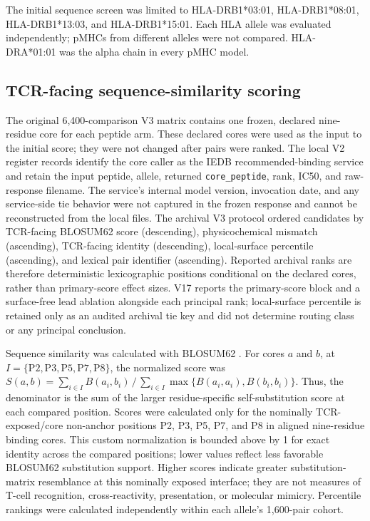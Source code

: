 \documentclass[11pt]{article}
\begin{document}
The initial sequence screen was limited to HLA-DRB1*03:01, HLA-DRB1*08:01, HLA-DRB1*13:03, and HLA-DRB1*15:01. Each HLA allele was evaluated independently; pMHCs from different alleles were not compared. HLA-DRA*01:01 was the alpha chain in every pMHC model.

\subsection{TCR-facing sequence-similarity scoring}
The original 6,400-comparison V3 matrix contains one frozen, declared nine-residue core for each peptide arm. These declared cores were used as the input to the initial score; they were not changed after pairs were ranked. The local V2 register records identify the core caller as the IEDB recommended-binding service and retain the input peptide, allele, returned \texttt{core\_peptide}, rank, IC50, and raw-response filename. The service's internal model version, invocation date, and any service-side tie behavior were not captured in the frozen response and cannot be reconstructed from the local files. The archival V3 protocol ordered candidates by TCR-facing BLOSUM62 score (descending), physicochemical mismatch (ascending), TCR-facing identity (descending), local-surface percentile (ascending), and lexical pair identifier (ascending). Reported archival ranks are therefore deterministic lexicographic positions conditional on the declared cores, rather than primary-score effect sizes. V17 reports the primary-score block and a surface-free lead ablation alongside each principal rank; local-surface percentile is retained only as an audited archival tie key and did not determine routing class or any principal conclusion.

Sequence similarity was calculated with BLOSUM62 \cite{blosum}. For cores $a$ and $b$, at $I=\{\mathrm{P2,P3,P5,P7,P8}\}$, the normalized score was $S(a,b)=\sum_{i\in I}B(a_i,b_i)\,/\,\sum_{i\in I}\max\{B(a_i,a_i),B(b_i,b_i)\}$. Thus, the denominator is the sum of the larger residue-specific self-substitution score at each compared position. Scores were calculated only for the nominally TCR-exposed/core non-anchor positions P2, P3, P5, P7, and P8 in aligned nine-residue binding cores. This custom normalization is bounded above by 1 for exact identity across the compared positions; lower values reflect less favorable BLOSUM62 substitution support. Higher scores indicate greater substitution-matrix resemblance at this nominally exposed interface; they are not measures of T-cell recognition, cross-reactivity, presentation, or molecular mimicry. Percentile rankings were calculated independently within each allele's 1,600-pair cohort.
\end{document}
